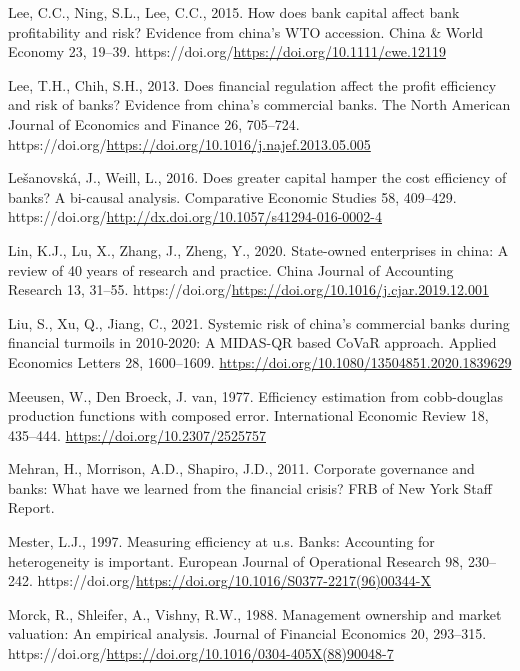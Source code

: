 \documentclass[
  12pt,
  a4paper,
]{scrreprt}
\newlength{\cslhangindent}
\newenvironment{CSLReferences}[2] %
 {\begin{list}{}{%
  \setlength{\itemindent}{0pt}
  \setlength{\leftmargin}{0pt}
  \setlength{\parsep}{0pt}
  \ifodd #1
   \setlength{\leftmargin}{\cslhangindent}
   \setlength{\itemindent}{-1\cslhangindent}
  \fi
  \setlength{\itemsep}{#2\baselineskip}}}
 {\end{list}}
\begin{document}
\begin{CSLReferences}{1}{0}
Lee, C.C., Ning, S.L., Lee, C.C., 2015. How does bank capital affect
bank profitability and risk? Evidence from china's WTO accession. China
\& World Economy 23, 19--39.
https://doi.org/\url{https://doi.org/10.1111/cwe.12119}

Lee, T.H., Chih, S.H., 2013. Does financial regulation affect the profit
efficiency and risk of banks? Evidence from china's commercial banks.
The North American Journal of Economics and Finance 26, 705--724.
https://doi.org/\url{https://doi.org/10.1016/j.najef.2013.05.005}

Lešanovská, J., Weill, L., 2016. Does greater capital hamper the cost
efficiency of banks? A bi-causal analysis. Comparative Economic Studies
58, 409--429.
https://doi.org/\url{http://dx.doi.org/10.1057/s41294-016-0002-4}

Lin, K.J., Lu, X., Zhang, J., Zheng, Y., 2020. State-owned enterprises
in china: A review of 40 years of research and practice. China Journal
of Accounting Research 13, 31--55.
https://doi.org/\url{https://doi.org/10.1016/j.cjar.2019.12.001}

Liu, S., Xu, Q., Jiang, C., 2021. Systemic risk of china's commercial
banks during financial turmoils in 2010-2020: A MIDAS-QR based CoVaR
approach. Applied Economics Letters 28, 1600--1609.
\url{https://doi.org/10.1080/13504851.2020.1839629}

Meeusen, W., Den Broeck, J. van, 1977. Efficiency estimation from
cobb-douglas production functions with composed error. International
Economic Review 18, 435--444. \url{https://doi.org/10.2307/2525757}

Mehran, H., Morrison, A.D., Shapiro, J.D., 2011. Corporate governance
and banks: What have we learned from the financial crisis? FRB of New
York Staff Report.

Mester, L.J., 1997. Measuring efficiency at u.s. Banks: Accounting for
heterogeneity is important. European Journal of Operational Research 98,
230--242.
https://doi.org/\url{https://doi.org/10.1016/S0377-2217(96)00344-X}

Morck, R., Shleifer, A., Vishny, R.W., 1988. Management ownership and
market valuation: An empirical analysis. Journal of Financial Economics
20, 293--315.
https://doi.org/\url{https://doi.org/10.1016/0304-405X(88)90048-7}


\end{CSLReferences}
\end{document}
